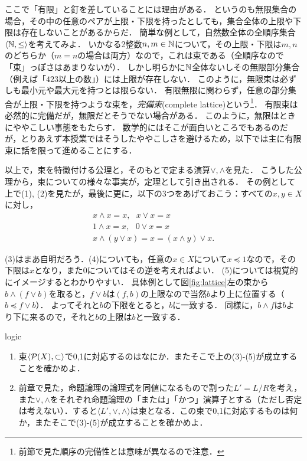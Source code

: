 \documentclass[11pt,a4paper, dvipdfmx]{jsarticle}
\begin{document}
\begin{attn}
ここで「有限」と釘を差していることには理由がある．
というのも無限集合の場合，その中の任意のペアが上限・下限を持ったとしても，集合全体の上限や下限は存在しないことがあるからだ．
簡単な例として，自然数全体の全順序集合$\langle \mathbb{N}, \leq \rangle$を考えてみよ．
いかなる2整数$n, m \in \mathbb{N}$について，その上限・下限は$m,n$のどちらか（$m=n$の場合は両方）なので，これは束である（全順序なので「束」っぽさはあまりないが）．
しかし明らかに$\mathbb{N}$全体ないしその無限部分集合（例えば「$423$以上の数」）には上限が存在しない．
このように，無限束は必ずしも最小元や最大元を持つとは限らない．
有限無限に関わらず，任意の部分集合が上限・下限を持つような束を，\emph{完備束}(complete lattice)という\footnote{前節で見た順序の完備性とは意味が異なるので注意．}．
有限束は必然的に完備だが，無限だとそうでない場合がある．
このように，無限はときにややこしい事態をもたらす．
数学的にはそこが面白いところでもあるのだが，とりあえず本授業ではそうしたややこしさを避けるため，以下では主に有限束に話を限って進めることにする． 
\end{attn}

以上で，束を特徴付ける公理と，そのもとで定まる演算$\vee, \wedge$を見た．
こうした公理から，束についての様々な事実が，定理として引き出される．
その例として上で(1), (2)を見たが，最後に更に，以下の3つをあげておこう：すべての$x, y \in X$に対し，
\begin{align}
 x \wedge x = x, \ \ \ x \vee x = x \\
 1 \wedge x = x, \ \ \ 0 \vee x = x \\
 x \wedge (y \vee x) = x = (x \wedge y) \vee x .
\end{align}

(3)はまあ自明だろう．(4)についても，任意の$x \in X$について$x \preceq 1$なので，その下限は$x$となり，また$0$についてはその逆を考えればよい．
(5)については視覚的にイメージするとわかりやすい．
具体例として図\ref{fig:lattice}左の束から$b \wedge (f \vee b)$を取ると，$f \vee b$は$(f, b)$の上限なので当然$b$より上に位置する（$b \preceq f \vee b$）．
よってそれと$b$の下限をとると，$b$に一致する．
同様に，$b \wedge f$は$b$より下に来るので，それと$b$の上限は$b$と一致する．

\begin{renshu}{}{logic}
\begin{enumerate} 
    \item 束$\langle \mathcal{P}(X), \subset \rangle$で0,1に対応するのはなにか．またそこで上の(3)-(5)が成立することを確かめよ．
    \item 前章で見た，命題論理の論理式を同値になるもので割った$L'= L/R$を考え，また$\vee, \wedge$をそれぞれ命題論理の「または」「かつ」演算子とする（ただし否定は考えない）．すると$\langle L', \vee, \wedge \rangle$は束となる．この束で0,1に対応するものは何か，またそこで(3)-(5)が成立することを確かめよ．
\end{enumerate}
\end{renshu}
\end{document}
